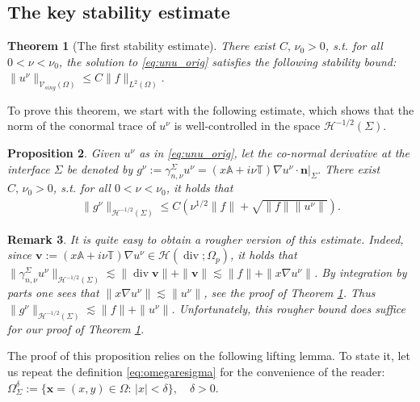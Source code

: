 \documentclass[report]{elsarticle}
\newtheorem{theorem}{Theorem}[section]
\newtheorem{proposition}[theorem]{Proposition}
\newtheorem{remark}[theorem]{Remark}
\numberwithin{theorem}{section}
\newcommand{\bx}{\mathbf{x}}
\renewcommand{\vec}[1]{\mathbf{#1}}
\begin{document}
\subsection{The key stability estimate}
\begin{theorem}[The first stability estimate]
	\label{theorem:stability_estimate}
	There exist $C,\, \nu_0>0$, s.t. for all $ 0<\nu<\nu_0$, the solution to \eqref{eq:unu_orig} satisfies the following stability bound: $
	\|u^{\nu}\|_{\mathcal{V}_{sing}(\Omega)}\leq C\|f\|_{L^2(\Omega)}.
	$
\end{theorem}
To prove this theorem, we start with the following estimate, which shows that the norm of the conormal trace of $u^{\nu}$ is well-controlled in the space $\mathcal{H}^{-1/2}(\Sigma)$. 
\begin{proposition}
	\label{prop:gnubound_proof}
	Given $u^{\nu}$ as in \eqref{eq:unu_orig}, let the co-normal derivative at the interface $\Sigma$ be denoted by 
	$g^{\nu}:=\gamma_{n, \nu}^{\Sigma}u^{\nu}=\left.( x \mathbb{A}+i\nu\mathbb{T})\nabla u^{\nu}\cdot \vec{n}\right|_{\Sigma}.%
	$
	There exist $C,\, \nu_0>0$, s.t. for all $0<\nu<\nu_0$, it holds that
	\begin{align}
		\label{eq:gnubound}
		\|g^{\nu}\|_{\mathcal{H}^{-1/2}(\Sigma)}\leq C\left(  \nu^{1/2}\|f\|+\sqrt{\|f\|\|u^{\nu}\|}\right).
	\end{align}
\end{proposition}
\begin{remark}
	It is quite easy to obtain a rougher version of this estimate. Indeed, since $\vec{v}:=(x\mathbb{A}+i\nu\mathbb{T})\nabla u^{\nu}\in \mathcal{H}(\operatorname{div};\Omega_p)$, it holds that $\|\gamma_{n,\nu}^{\Sigma }u^{\nu}\|_{\mathcal{H}^{-1/2}(\Sigma)}\lesssim \|\operatorname{div}\vec{v}\|+\|\vec{v}\|\lesssim\|f\|+\|x\nabla u^{\nu}\|$. By integration by parts one sees that $\|x\nabla u^{\nu}\|\lesssim \|u^{\nu}\|$, see the proof of Theorem \ref{theorem:stability_estimate}. Thus $\|g^{\nu}\|_{\mathcal{H}^{-1/2}(\Sigma)}\lesssim \|f\|+\|u^{\nu}\|$. Unfortunately, this rougher bound does suffice for our proof of Theorem \ref{theorem:stability_estimate}.
\end{remark}
The proof of this proposition relies on the following lifting lemma. To state it, let us repeat the definition \eqref{eq:omegaresigma} for the convenience of the reader: $
\Omega^{\delta}_{\Sigma}:=
\{\bx=(x,y)\in \Omega: \, |x|<\delta\},  \quad \delta>0.
$
\end{document}
